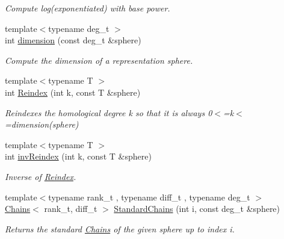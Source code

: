 \begin{DoxyCompactItemize}
\begin{DoxyCompactList}\small\item\em Compute log(exponentiated) with base power. \end{DoxyCompactList}\item 
{\footnotesize template$<$typename deg\+\_\+t $>$ }\\int \hyperlink{namespaceMackey_a6a5d40e69e5628ea84896ee43f4a91fa}{dimension} (const deg\+\_\+t \&sphere)
\begin{DoxyCompactList}\small\item\em Compute the dimension of a representation sphere. \end{DoxyCompactList}\item 
{\footnotesize template$<$typename T $>$ }\\int \hyperlink{namespaceMackey_acb84c147d9ee39eac2883a762e3710dd}{Reindex} (int k, const T \&sphere)
\begin{DoxyCompactList}\small\item\em Reindexes the homological degree k so that it is always 0$<$=k$<$=dimension(sphere) \end{DoxyCompactList}\item 
{\footnotesize template$<$typename T $>$ }\\int \hyperlink{namespaceMackey_a011b8e23bc2eedf751a9ce7bdc9e4cb9}{inv\+Reindex} (int k, const T \&sphere)
\begin{DoxyCompactList}\small\item\em Inverse of \hyperlink{namespaceMackey_a7da73ade3ee83c4ffd614e79242d7c04}{Reindex}. \end{DoxyCompactList}\item 
{\footnotesize template$<$typename rank\+\_\+t , typename diff\+\_\+t , typename deg\+\_\+t $>$ }\\\hyperlink{classMackey_1_1Chains}{Chains}$<$ rank\+\_\+t, diff\+\_\+t $>$ \hyperlink{namespaceMackey_aac9deeccbe291d1dd17df46a3d7c1f2b}{Standard\+Chains} (int i, const deg\+\_\+t \&sphere)
\begin{DoxyCompactList}\small\item\em Returns the standard \hyperlink{classMackey_1_1Chains}{Chains} of the given sphere up to index i. \end{DoxyCompactList}\end{DoxyCompactItemize}
